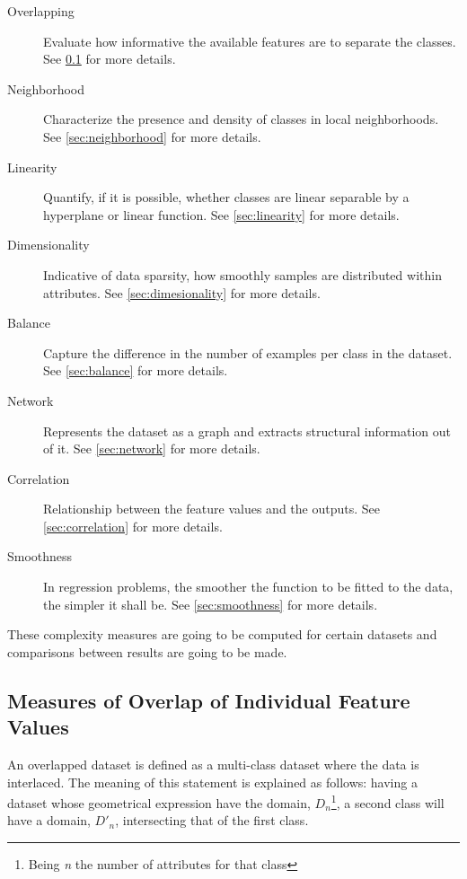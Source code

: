 \begin{description}
    \item [Overlapping] Evaluate how informative the available features are to 
    separate the classes. See \ref{sec:overlap} for more details.
    \item [Neighborhood] Characterize the presence and density of classes in 
    local neighborhoods. See \ref{sec:neighborhood} for more details.
    \item [Linearity] Quantify, if it is possible, whether classes are linear 
    separable by a hyperplane or linear function. See \ref{sec:linearity} for 
    more details.
    \item [Dimensionality] Indicative of data sparsity, how smoothly samples are
    distributed within attributes. See \ref{sec:dimesionality} for more details.
    \item [Balance] Capture the difference in the number of examples per class 
    in the dataset. See \ref{sec:balance} for more details.
    \item [Network] Represents the dataset as a graph and extracts structural 
    information out of it. See \ref{sec:network} for more details.
    \item [Correlation] Relationship between the feature values and the outputs.
    See \ref{sec:correlation} for more details. 
    \item [Smoothness] In regression problems, the smoother the function to be
    fitted to the data, the simpler it shall be. See \ref{sec:smoothness} for 
    more details.
\end{description}

These complexity measures are going to be computed for certain datasets and
comparisons between results are going to be made.

\subsection{Measures of Overlap of Individual Feature Values}\label{sec:overlap}

An overlapped dataset is defined as a multi-class dataset where the data is 
interlaced. The meaning of this statement is explained as follows: having a 
dataset whose geometrical expression have the domain, $D_n$\footnote{Being 
\textit{n} the number of attributes for that class}, a second class will have a 
domain, $D'_n$, intersecting that of the first class.

